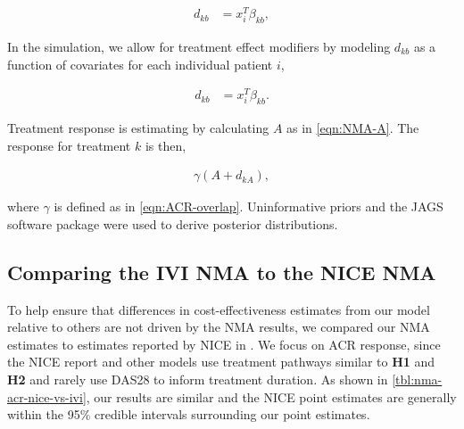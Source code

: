 \documentclass[11pt,final,fleqn]{article}\usepackage[]{graphicx}\usepackage[]{color}
\theoremstyle{plain}
\begin{document}
\begin{appendices}
\begin{align}
d_{kb} &= x_{i}^T\beta_{kb},
\end{align}

In the simulation, we allow for treatment effect modifiers by modeling $d_{kb}$ as a function of covariates for each individual patient $i$,

\begin{align}
d_{kb} &= x_{i}^T\beta_{kb}.
\end{align}

Treatment response is estimating by calculating $A$ as in \autoref{eqn:NMA-A}. The response for treatment $k$ is then,

\begin{align}
\gamma (A + d_{kA}),
\end{align}

where $\gamma$ is defined as in \autoref{eqn:ACR-overlap}. Uninformative priors and the JAGS software package were used to derive posterior distributions.

\subsection{Comparing the IVI NMA to the NICE NMA}\label{app:nma-ivi-nice-comp}
To help ensure that differences in cost-effectiveness estimates from our model relative to others are not driven by the NMA results, we compared our NMA estimates to estimates reported by NICE in \citet{stevenson2016adalimumab}. We focus on ACR response, since the NICE report and other models use treatment pathways similar to \textbf{H1} and \textbf{H2} and rarely use DAS28 to inform treatment duration. As shown in \autoref{tbl:nma-acr-nice-vs-ivi}, our results are similar and the NICE point estimates are generally within the 95\% credible intervals surrounding our point estimates.


\end{appendices}
\end{document}
